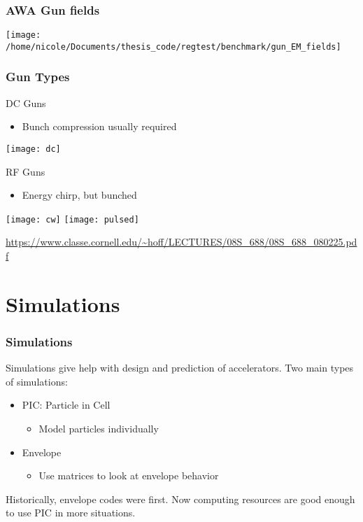\documentclass[professionalfonts,t]{beamer}
\begin{document}
\begin{frame}
	\frametitle{AWA Gun fields}
	\centering
	\texttt{[image: /home/nicole/Documents/thesis\_code/regtest/benchmark/gun\_EM\_fields]}
\end{frame}

\begin{frame}[containsverbatim]
\frametitle{Gun Types}
\vspace{1em}

\begin{minipage}{0.49\textwidth}
	DC Guns
	\begin{itemize}
		\item Bunch compression usually required
	\end{itemize}
\texttt{[image: dc]}
\end{minipage}
\begin{minipage}{0.49\textwidth}
	RF Guns
	\begin{itemize}
		\item Energy chirp, but bunched
	\end{itemize}
\texttt{[image: cw]}
\texttt{[image: pulsed]}

\end{minipage}

\vspace{2em}
\tiny
\url{https://www.classe.cornell.edu/~hoff/LECTURES/08S_688/08S_688_080225.pdf}
\end{frame}


\section{Simulations}
\begin{frame}
\frametitle{Simulations}
Simulations give help with design and prediction of accelerators.
Two main types of simulations:

\vspace{1em}
\begin{itemize}
	\item PIC: Particle in Cell
	\begin{itemize}
		\item Model particles individually 
	\end{itemize}
	\item Envelope
	\begin{itemize}
		\item Use matrices to look at envelope behavior
	\end{itemize}
\end{itemize}

\vspace{1em}
Historically, envelope codes were first. 
Now computing resources are good enough to use PIC in more situations.
\end{frame}
\end{document}
